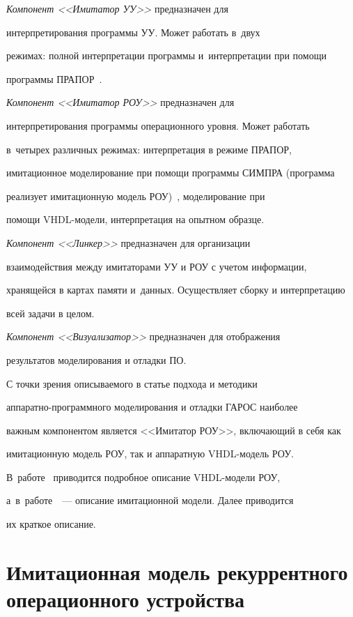   \textit{Компонент <<Имитатор УУ>>} предназначен для 

интерпретирования программы УУ. Может работать в~двух 

режимах: полной интерпретации программы и~интерпретации при помощи 

программы ПРАПОР~\cite{6-step}.

  

  \textit{Компонент <<Имитатор РОУ>>} предназначен для 

интерпретирования программы операционного уровня. Может работать 

в~четырех различных режимах: интерпретация в режиме ПРАПОР, 

имитационное моделирование при помощи программы СИМПРА (программа 

реализует имитационную модель РОУ)~\cite{7-step}, моделирование при 

помощи VHDL-мо\-де\-ли, интерпретация на опытном образце.

  

  \textit{Компонент <<Линкер>>} предназначен для организации 

взаимодействия между имитаторами УУ и РОУ с учетом информации, 

хранящейся в картах памяти и~данных. Осуществляет сборку и интерпретацию 

всей задачи в целом.

  

  \textit{Компонент <<Визуализатор>>} предназначен для отображения 

результатов моделирования и отладки ПО.

  

  С точки зрения описываемого в статье подхода и методики  

ап\-па\-рат\-но-про\-граммно\-го моделирования и отладки ГАРОС наиболее 

важным компонентом является <<Имитатор РОУ>>, включающий в себя как 

имитационную модель РОУ, так и аппаратную VHDL-мо\-дель РОУ. 

В~работе~\cite{1-step} приводится подробное описание VHDL-модели РОУ, 

а~в~работе~\cite{8-step}~--- описание имитационной модели. Далее приводится 

их краткое описание.





\section{Имитационная модель рекуррентного операционного устройства}







